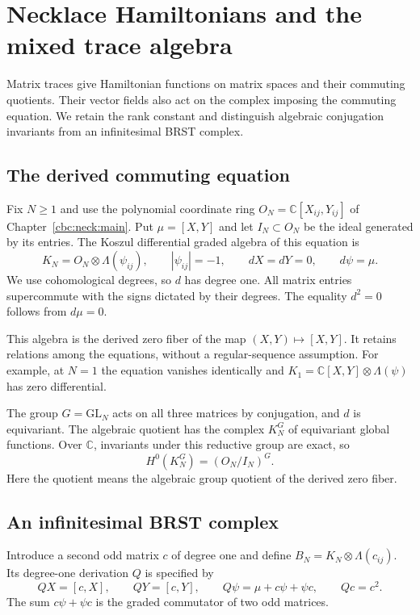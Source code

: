 \chapter{Necklace Hamiltonians and the mixed trace algebra}\label{chap:trace}
Matrix traces give Hamiltonian functions on matrix spaces and their
commuting quotients.  Their vector fields also act on the complex imposing
the commuting equation.  We retain the rank constant and distinguish
algebraic conjugation invariants from an infinitesimal BRST complex.

\section{The derived commuting equation}
Fix $N\geq1$ and use the polynomial coordinate ring
$O_N=\mathbb C[X_{ij},Y_{ij}]$ of Chapter~\ref{cbc:neck:main}.  Put
$\mu=[X,Y]$ and let $I_N\subset O_N$ be the ideal generated by its entries.
The Koszul differential graded algebra of this equation is
\begin{equation}\label{cbc:neck:koszul}
 K_N=O_N\otimes\Lambda(\psi_{ij}),\qquad
 |\psi_{ij}|=-1,\qquad dX=dY=0,\qquad d\psi=\mu.
\end{equation}
We use cohomological degrees, so $d$ has degree one.  All matrix entries
supercommute with the signs dictated by their degrees.  The equality $d^2=0$
follows from $d\mu=0$.

This algebra is the derived zero fiber of the map $(X,Y)\mapsto[X,Y]$.
It retains relations among the equations, without a regular-sequence
assumption.  For example, at $N=1$ the equation vanishes identically and
$K_1=\mathbb C[X,Y]\otimes\Lambda(\psi)$ has zero differential.

The group $G=\mathrm{GL}_N$ acts on all three matrices by conjugation, and
$d$ is equivariant.  The algebraic quotient has the complex $K_N^G$ of
equivariant global functions.  Over $\mathbb C$, invariants under this
reductive group are exact, so
\begin{equation}\label{cbc:neck:quotient-h0}
 H^0(K_N^G)=(O_N/I_N)^G.
\end{equation}
Here the quotient means the algebraic group quotient of the derived zero
fiber.

\section{An infinitesimal BRST complex}
Introduce a second odd matrix $c$ of degree one and define
$B_N=K_N\otimes\Lambda(c_{ij})$.  Its degree-one derivation $Q$ is specified by
\begin{equation}\label{cbc:neck:brst}
 QX=[c,X],\qquad QY=[c,Y],\qquad
 Q\psi=\mu+c\psi+\psi c,\qquad Qc=c^2.
\end{equation}
The sum $c\psi+\psi c$ is the graded commutator of two odd matrices.

